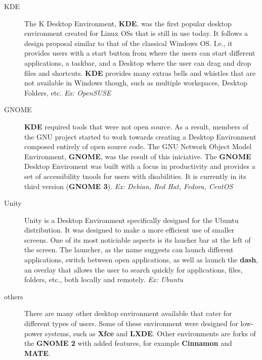 \begin{description}
\item[KDE]  The K Desktop Environment, \textbf{KDE}, was the first popular desktop environment created for Linux \acs{OS}s that is still in use today. It follows a design proposal similar to that of the classical Windows \acs{OS}. I.e., it provides users with a start button from where the users can start different applications, a taskbar, and a Desktop where the user can drag and drop files and shortcuts. \textbf{KDE} provides many extras bells and whistles that are not available in Windows though, such as multiple workspaces, Desktop Folders, etc. \textit{Ex: OpenSUSE}
\item[GNOME] \textbf{KDE} required tools that were not open source. As a result, members of the \acs{GNU} project started to work towards creating a Desktop Environment composed entirely of open source code. The \acs{GNU} Network Object Model Environment, \textbf{GNOME}, was the result of this iniciative. The \textbf{GNOME} Desktop Enviroment was built with a focus in productivity and provides a set of accessibility tnools for users with disabilities. It is currently in its third version (\textbf{GNOME 3}). \textit{Ex: Debian, Red Hat, Fedora, CentOS}
\item[Unity] Unity is a Desktop Environment specifically designed for the Ubuntu distribution. It was designed to make a more efficient use of smaller screens. One of its most noticiable aspects is its laucher bar at the left of the screen. The launcher, as the name suggests can launch different applications, switch between open applications, as well as launch the \textbf{dash}, an overlay that allows the user to search quickly for applications, files, folders, etc., both locally and remotely. \textit{Ex: Ubuntu}
\item[others] There are many other desktop environment available that cater for different types of users. Some of these environment were designed for low-power systems, such as \textbf{Xfce} and \textbf{LXDE}. Other environments are forks of the \textbf{GNOME 2} with added features, for example \textbf{Cinnamon} and \textbf{MATE}.
\end{description}

